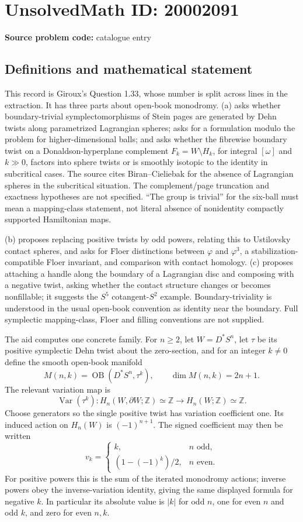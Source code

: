 \documentclass[11pt]{article}
\newcommand{\Z}{\mathbb{Z}}
\begin{document}
\section*{UnsolvedMath ID: 20002091}
\textbf{Source problem code:} catalogue entry
\subsection{Definitions and mathematical statement}
This record is Giroux's Question 1.33, whose number is split across lines in the extraction. It has three parts about open-book monodromy. (a) asks whether boundary-trivial symplectomorphisms of Stein pages are generated by Dehn twists along parametrized Lagrangian spheres; asks for a formulation modulo the problem for higher-dimensional balls; and asks whether the fibrewise boundary twist on a Donaldson-hyperplane complement \(F_k=W\setminus H_k\), for integral \([\omega]\) and \(k\gg0\), factors into sphere twists or is smoothly isotopic to the identity in subcritical cases. The source cites Biran--Cieliebak for the absence of Lagrangian spheres in the subcritical situation. The complement/page truncation and exactness hypotheses are not specified. ``The group is trivial'' for the six-ball must mean a mapping-class statement, not literal absence of nonidentity compactly supported Hamiltonian maps.

(b) proposes replacing positive twists by odd powers, relating this to Ustilovsky contact spheres, and asks for Floer distinctions between \(\varphi\) and \(\varphi^3\), a stabilization-compatible Floer invariant, and comparison with contact homology. (c) proposes attaching a handle along the boundary of a Lagrangian disc and composing with a negative twist, asking whether the contact structure changes or becomes nonfillable; it suggests the \(S^5\) cotangent-\(S^2\) example. Boundary-triviality is understood in the usual open-book convention as identity near the boundary. Full symplectic mapping-class, Floer and filling conventions are not supplied.

The aid computes one concrete family. For \(n\geq2\), let \(W=D^*S^n\), let \(\tau\) be its positive symplectic Dehn twist about the zero-section, and for an integer \(k\ne0\) define the smooth open-book manifold
\[
 M(n,k)=\operatorname{OB}(D^*S^n,\tau^k),\qquad\dim M(n,k)=2n+1.
\]
The relevant variation map is
\[
 \operatorname{Var}(\tau^k):H_n(W,\partial W;\Z)\simeq\Z
                \longrightarrow H_n(W;\Z)\simeq\Z.
\]
Choose generators so the single positive twist has variation coefficient one. Its induced action on \(H_n(W)\) is \((-1)^{n+1}\). The signed coefficient may then be written
\[
 v_k=\begin{cases}
 k,&n\text{ odd},\\
 (1-(-1)^k)/2,&n\text{ even}.
 \end{cases}
\]
For positive powers this is the sum of the iterated monodromy actions; inverse powers obey the inverse-variation identity, giving the same displayed formula for negative \(k\). In particular its absolute value is \(|k|\) for odd \(n\), one for even \(n\) and odd \(k\), and zero for even \(n,k\).
\end{document}
